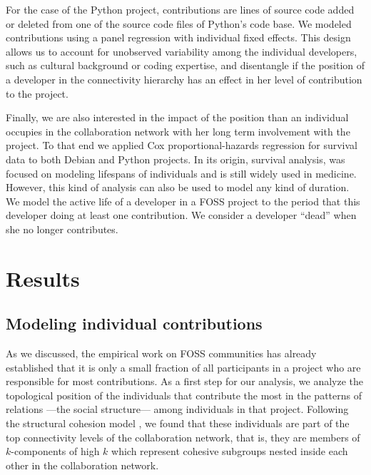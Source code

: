 For the case of the Python project, contributions are lines of source code added or deleted from one of the source code files of Python's code base. We modeled contributions using a panel regression with individual fixed effects. This design allows us to account for unobserved variability among the individual developers, such as cultural background or coding expertise, and disentangle if the position of a developer in the connectivity hierarchy has an effect in her level of contribution to the project.

Finally, we are also interested in the impact of the position than an individual occupies in the collaboration network with her long term involvement with the project. To that end we applied Cox proportional-hazards regression for survival data to both Debian and Python projects. In its origin, survival analysis, was focused on modeling lifespans of individuals and is still widely used in medicine. However, this kind of analysis can also be used to model any kind of duration. We model the active life of a developer in a FOSS project to the period that this developer doing at least one contribution. We consider a developer ``dead'' when she no longer contributes.

\section{Results}

\subsection{Modeling individual contributions}

As we discussed, the empirical work on FOSS communities has already established that it is only a small fraction of all participants in a project who are responsible for most contributions. As a first step for our analysis, we analyze the topological position of the individuals that contribute the most in the patterns of relations ---the social structure--- among individuals in that project. Following the structural cohesion model \citep{moody:2003}, we found that these individuals are part of the top connectivity levels of the collaboration network, that is, they are members of $k$-components of high $k$ which represent cohesive subgroups nested inside each other in the collaboration network. 

